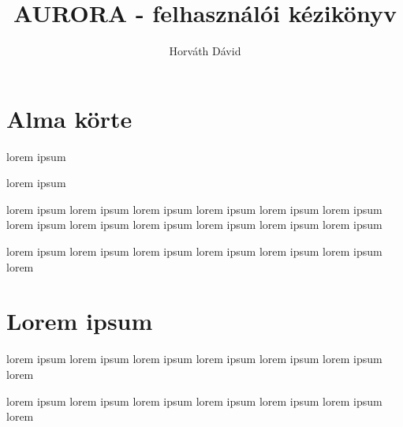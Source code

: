 \documentclass[]{article}
\title{AURORA - felhasználói kézikönyv}
\author{Horváth Dávid}
\begin{document}
\maketitle

\tableofcontents

\newpage

\section{Alma körte}

  lorem ipsum
  
  lorem ipsum
  
  lorem ipsum lorem ipsum lorem ipsum lorem ipsum
  lorem ipsum lorem ipsum lorem ipsum lorem ipsum
  lorem ipsum lorem ipsum lorem ipsum lorem ipsum
  
  lorem ipsum lorem ipsum lorem ipsum lorem ipsum
  lorem ipsum lorem ipsum lorem
  
\section{Lorem ipsum}
  
  lorem ipsum lorem ipsum lorem ipsum lorem ipsum
  lorem ipsum lorem ipsum lorem
  
  lorem ipsum lorem ipsum lorem ipsum lorem ipsum
  lorem ipsum lorem ipsum lorem
  
\end{document}
